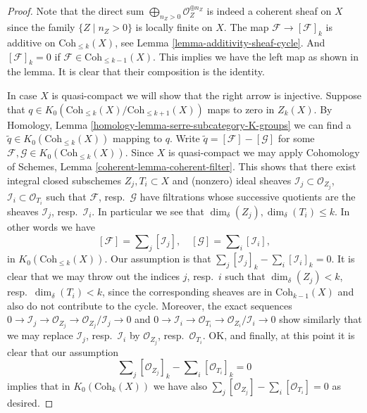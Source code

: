 \begin{proof}
Note that the direct sum
$\bigoplus\nolimits_{n_Z > 0} \mathcal{O}_Z^{\oplus n_Z}$
is indeed a coherent sheaf on $X$ since the family $\{Z \mid n_Z > 0\}$
is locally finite on $X$.
The map $\mathcal{F} \to [\mathcal{F}]_k$ is additive
on $\text{Coh}_{\leq k}(X)$, see
Lemma \ref{lemma-additivity-sheaf-cycle}. And $[\mathcal{F}]_k = 0$
if $\mathcal{F} \in \text{Coh}_{\leq k - 1}(X)$.
This implies we have the left map as shown in the lemma.
It is clear that their composition is the identity.

\medskip\noindent
In case $X$ is quasi-compact we will show that the right arrow
is injective.
Suppose that $q \in K_0(\text{Coh}_{\leq k}(X)/\text{Coh}_{\leq k + 1}(X))$
maps to zero in $Z_k(X)$. By
Homology, Lemma \ref{homology-lemma-serre-subcategory-K-groups}
we can find
a $\tilde q \in K_0(\text{Coh}_{\leq k}(X))$ mapping to $q$.
Write $\tilde q = [\mathcal{F}] - [\mathcal{G}]$ for some
$\mathcal{F}, \mathcal{G} \in K_0(\text{Coh}_{\leq k}(X))$.
Since $X$ is quasi-compact we may apply
Cohomology of Schemes, Lemma \ref{coherent-lemma-coherent-filter}.
This shows that there exist integral closed subschemes
$Z_j, T_i \subset X$ and (nonzero) ideal sheaves
$\mathcal{I}_j \subset \mathcal{O}_{Z_j}$,
$\mathcal{I}_i \subset \mathcal{O}_{T_i}$ such that
$\mathcal{F}$, resp.\ $\mathcal{G}$ have filtrations whose successive
quotients are the sheaves $\mathcal{I}_j$, resp.\ $\mathcal{I}_i$.
In particular we see that $\dim_\delta(Z_j), \dim_\delta(T_i) \leq k$.
In other words we have
$$
[\mathcal{F}] = \sum\nolimits_j [\mathcal{I}_j],
\quad
[\mathcal{G}] = \sum\nolimits_i [\mathcal{I}_i],
$$
in $K_0(\text{Coh}_{\leq k}(X))$. Our assumption is that
$\sum_j [\mathcal{I}_j]_k - \sum_i [\mathcal{I}_i]_k = 0$.
It is clear that we may throw out the indices $j$, resp.\ $i$
such that $\dim_\delta(Z_j) < k$, resp.\ $\dim_\delta(T_i) < k$,
since the corresponding sheaves are in $\text{Coh}_{k - 1}(X)$ and
also do not contribute to the cycle. Moreover, the exact sequences
$0 \to \mathcal{I}_j \to \mathcal{O}_{Z_j} \to
\mathcal{O}_{Z_j}/\mathcal{I}_j \to 0$
and
$0 \to \mathcal{I}_i \to \mathcal{O}_{T_i} \to
\mathcal{O}_{Z_i}/\mathcal{I}_i \to 0$
show similarly that we may replace $\mathcal{I}_j$, resp.\ $\mathcal{I}_i$
by $\mathcal{O}_{Z_j}$, resp.\ $\mathcal{O}_{T_i}$.
OK, and finally, at this point it is clear that our assumption
$$
\sum\nolimits_j [\mathcal{O}_{Z_j}]_k - \sum\nolimits_i [\mathcal{O}_{T_i}]_k
= 0
$$
implies that in $K_0(\text{Coh}_k(X))$ we have also
$\sum\nolimits_j [\mathcal{O}_{Z_j}] - \sum\nolimits_i [\mathcal{O}_{T_i}]
= 0$
as desired.
\end{proof}

